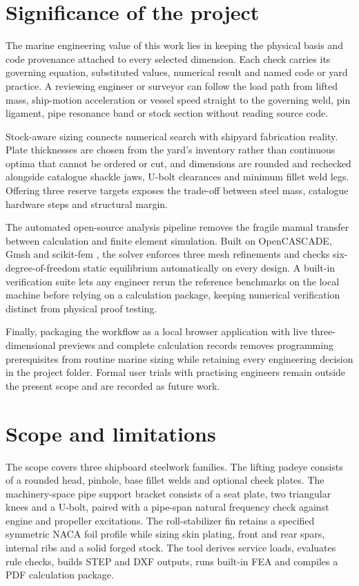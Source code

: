 \section{Significance of the project}
\label{sec:significance}

The marine engineering value of this work lies in keeping the physical basis and code provenance attached to every selected dimension. Each check carries its governing equation, substituted values, numerical result and named code or yard practice. A reviewing engineer or surveyor can follow the load path from lifted mass, ship-motion acceleration or vessel speed straight to the governing weld, pin ligament, pipe resonance band or stock section without reading source code.

Stock-aware sizing connects numerical search with shipyard fabrication reality. Plate thicknesses are chosen from the yard's inventory rather than continuous optima that cannot be ordered or cut, and dimensions are rounded and rechecked alongside catalogue shackle jaws, U-bolt clearances and minimum fillet weld legs. Offering three reserve targets exposes the trade-off between steel mass, catalogue hardware steps and structural margin.

The automated open-source analysis pipeline removes the fragile manual transfer between calculation and finite element simulation. Built on OpenCASCADE, Gmsh and scikit-fem \cite{gmsh2009,skfem2020}, the solver enforces three mesh refinements and checks six-degree-of-freedom static equilibrium automatically on every design. A built-in verification suite lets any engineer rerun the reference benchmarks on the local machine before relying on a calculation package, keeping numerical verification distinct from physical proof testing.

Finally, packaging the workflow as a local browser application with live three-dimensional previews and complete calculation records removes programming prerequisites from routine marine sizing while retaining every engineering decision in the project folder. Formal user trials with practising engineers remain outside the present scope and are recorded as future work.

\section{Scope and limitations}
\label{sec:scope-limitations}

The scope covers three shipboard steelwork families. The lifting padeye consists of a rounded head, pinhole, base fillet welds and optional cheek plates. The machinery-space pipe support bracket consists of a seat plate, two triangular knees and a U-bolt, paired with a pipe-span natural frequency check against engine and propeller excitations. The roll-stabilizer fin retains a specified symmetric NACA foil profile while sizing skin plating, front and rear spars, internal ribs and a solid forged stock. The tool derives service loads, evaluates rule checks, builds STEP and DXF outputs, runs built-in FEA and compiles a PDF calculation package.

